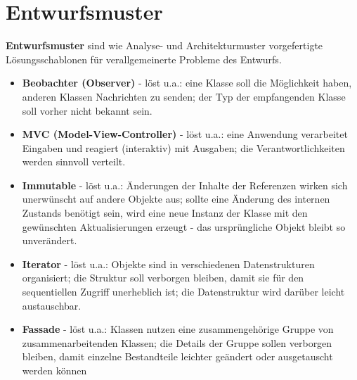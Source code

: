 \section{Entwurfsmuster}

\begin{tcolorbox}[title=Entwurfsmuster]
    \textbf{Entwurfsmuster} sind wie Analyse- und Architekturmuster vorgefertigte Lösungsschablonen für verallgemeinerte Probleme des Entwurfs.\\

    \begin{itemize}
        \item \textbf{Beobachter (Observer)} - löst u.a.: eine Klasse soll die Möglichkeit haben, anderen Klassen Nachrichten zu senden;
         der Typ der empfangenden Klasse soll vorher nicht bekannt sein.
        \item \textbf{MVC (Model-View-Controller)} - löst u.a.: eine Anwendung verarbeitet Eingaben und reagiert (interaktiv) mit Ausgaben; die Verantwortlichkeiten werden sinnvoll verteilt.
        \item \textbf{Immutable} - löst u.a.: Änderungen der Inhalte der Referenzen wirken sich unerwünscht auf andere Objekte aus; sollte eine Änderung des internen Zustands benötigt sein, wird eine neue Instanz der Klasse mit den gewünschten Aktualisierungen erzeugt - das ursprüngliche Objekt bleibt so unverändert.
        \item \textbf{Iterator} - löst u.a.: Objekte sind in verschiedenen Datenstrukturen organisiert; die Struktur soll verborgen bleiben, damit sie für den sequentiellen Zugriff unerheblich ist; die Datenstruktur wird darüber leicht austauschbar.
        \item \textbf{Fassade } - löst u.a.: Klassen nutzen eine zusammengehörige Gruppe von zusammenarbeitenden Klassen;
        die Details der Gruppe sollen verborgen bleiben, damit einzelne Bestandteile leichter geändert oder ausgetauscht werden können
    \end{itemize}
\end{tcolorbox}


